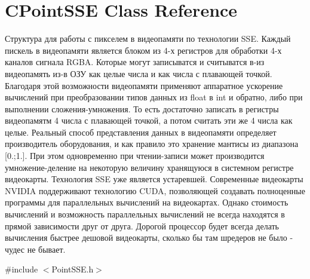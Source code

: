 \hypertarget{class_c_point_s_s_e}{\section{C\+Point\+S\+S\+E Class Reference}
\label{class_c_point_s_s_e}
}


Структура для работы с пикселем в видеопамяти по технологии S\+S\+E. Каждый пискель в видеопамяти является блоком из 4-\/х регистров для обработки 4-\/х каналов сигнала R\+G\+B\+A. Которые могут записыватся и считыватся в-\/из видеопамять из-\/в ОЗУ как целые числа и как числа с плавающей точкой. Благодаря этой возможности видеопамяти применяют аппаратное ускорение вычислений при преобразовании типов данных из float в int и обратно, либо при выполнении сложения-\/умножения. То есть достаточно записать в регистры видеопамятм 4 числа с плавающей точкой, а потом считать эти же 4 числа как целые. Реальный способ представления данных в видеопамяти определяет производитель оборудования, и как правило это хранение мантисы из диапазона \mbox{[}0.;1.\mbox{]}. При этом одновременно при чтении-\/записи может производится умножение-\/деление на некоторую величину хранящуюся в системном регистре видеокарты. Технология S\+S\+E уже является устаревшей. Современные видеокарты N\+V\+I\+D\+I\+A поддерживают технологию C\+U\+D\+A, позволяющей создавать полноценные программы для параллельных вычислений на видеокартах. Однако стоимость вычислений и возможность параллельных вычислений не всегда находятся в прямой зависимости друг от друга. Дорогой процессор будет всегда делать вычисления быстрее дешовой видеокарты, сколько бы там шредеров не было -\/ чудес не бывает.  




{\ttfamily \#include $<$Point\+S\+S\+E.\+h$>$}

